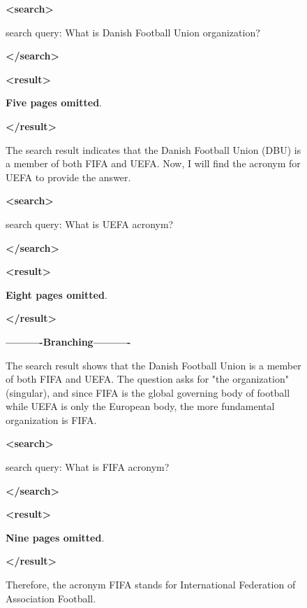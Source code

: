 \documentclass{llmxive}
\begin{document}
\begin{figure}[h]
\begin{minipage}[t]{0.48\linewidth}
\begin{tcolorbox}
    \textbf{<search>}
    
    search query: What is Danish Football Union organization?
    
    \textbf{</search>}
    
    \textbf{<result>}
    
    \textbf{Five pages omitted}.

    \textbf{</result>}

    The search result indicates that the Danish Football Union (DBU) is a member 
    of both FIFA and UEFA. Now, I will find the acronym for UEFA to provide the answer.

    \textbf{<search>}
    
    search query: What is UEFA acronym?
    
    \textbf{</search>}
    
    \textbf{<result>}
    
    \textbf{Eight pages omitted}.

    \textbf{</result>}

    \textbf{----------Branching----------}
    
    The search result shows that the Danish Football Union is a member of both 
    FIFA and UEFA. The question asks for "the organization" (singular), and since 
    FIFA is the global governing body of football while UEFA is only the European 
    body, the more fundamental organization is FIFA.

    \textbf{<search>}
    
    search query: What is FIFA acronym?
    
    \textbf{</search>}
    
    \textbf{<result>}
    
    \textbf{Nine pages omitted}.

    \textbf{</result>}

    Therefore, the acronym FIFA stands for International Federation of 
    Association Football.
    \end{tcolorbox}
\end{minipage}

\end{figure}
\end{document}
